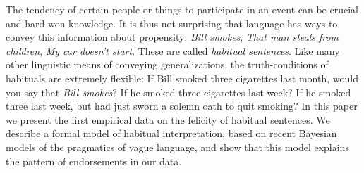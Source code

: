 \documentclass[10pt,letterpaper]{article}
\begin{document}
The tendency of certain people or things to participate in an event can be crucial and hard-won knowledge. 
It is thus not surprising that language has ways to convey this information about propensity:
\emph{Bill smokes}, \emph{That man steals from children}, \emph{My car doesn't start}.
These are called \emph{habitual sentences}.
Like many other linguistic means of conveying generalizations, the truth-conditions of habituals are extremely flexible:
If Bill smoked three cigarettes last month, would you say that \emph{Bill smokes}? If he smoked three cigarettes last week? If he smoked three last week, but had just sworn a solemn oath to quit smoking?
In this paper we present the first empirical data on the felicity of habitual sentences. 
We describe a formal model of habitual interpretation, based on recent Bayesian models of the pragmatics of vague language, and show that this model explains the pattern of endorsements in our data.







\end{document}
